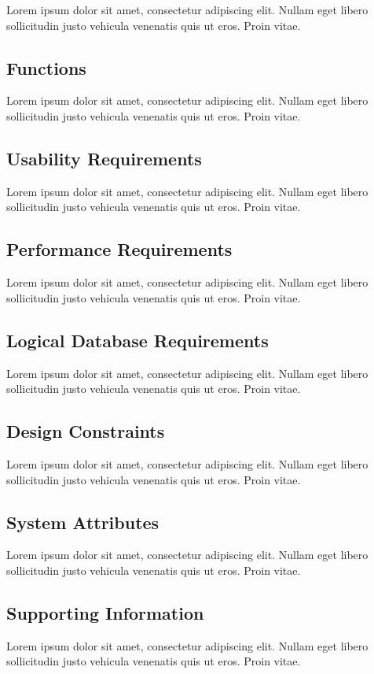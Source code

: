 \documentclass[a4paper]{article}
\begin{document}
        Lorem ipsum dolor sit amet, consectetur adipiscing elit. Nullam eget libero sollicitudin justo vehicula venenatis quis ut eros. Proin vitae.

        \subsection{Functions}

        Lorem ipsum dolor sit amet, consectetur adipiscing elit. Nullam eget libero sollicitudin justo vehicula venenatis quis ut eros. Proin vitae.

        \subsection{Usability Requirements}

        Lorem ipsum dolor sit amet, consectetur adipiscing elit. Nullam eget libero sollicitudin justo vehicula venenatis quis ut eros. Proin vitae.

        \subsection{Performance Requirements}

        Lorem ipsum dolor sit amet, consectetur adipiscing elit. Nullam eget libero sollicitudin justo vehicula venenatis quis ut eros. Proin vitae.

        \subsection{Logical Database Requirements}

        Lorem ipsum dolor sit amet, consectetur adipiscing elit. Nullam eget libero sollicitudin justo vehicula venenatis quis ut eros. Proin vitae.

        \subsection{Design Constraints}

        Lorem ipsum dolor sit amet, consectetur adipiscing elit. Nullam eget libero sollicitudin justo vehicula venenatis quis ut eros. Proin vitae.

        \subsection{System Attributes}

        Lorem ipsum dolor sit amet, consectetur adipiscing elit. Nullam eget libero sollicitudin justo vehicula venenatis quis ut eros. Proin vitae.

        \subsection{Supporting Information}

        Lorem ipsum dolor sit amet, consectetur adipiscing elit. Nullam eget libero sollicitudin justo vehicula venenatis quis ut eros. Proin vitae.
\end{document}
